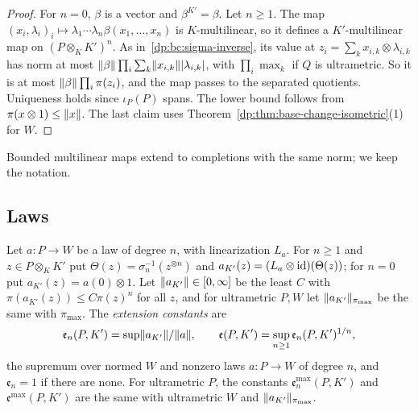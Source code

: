 \begin{proof}
For $n=0$, $\beta$ is a vector and $\beta^{K'}=\beta$. Let $n\ge1$. The map $(x_i,\lambda_i)_i\mapsto\lambda_1\cdots\lambda_n\beta(x_1,\dots,x_n)$ is $K$-multilinear, so it defines a $K'$-multilinear map on $(P\otimes_KK')^n$. As in~\eqref{dp:bc:sigma-inverse}, its value at $z_i=\sum_kx_{i,k}\otimes\lambda_{i,k}$ has norm at most $\lVert \beta\rVert\prod_i\sum_k\lVert x_{i,k}\rVert\lvert \lambda_{i,k}\rvert$, with $\prod_i\max_k$ if $Q$ is ultrametric. So it is at most $\lVert \beta\rVert\prod_i\pi(z_i)$, and the map passes to the separated quotients. Uniqueness holds since $\iota_P(P)$ spans. The lower bound follows from $\pi(x\otimes1)\le\lVert x\rVert$. The last claim uses Theorem~\ref{dp:thm:base-change-isometric}(1) for $W$.
\end{proof}

Bounded multilinear maps extend to completions with the same norm; we keep the notation.

\subsection{Laws}

Let $a\colon P\to W$ be a law of degree $n$, with linearization $L_a$. For $n\ge1$ and $z\in P\otimes_KK'$ put $\Theta(z)=\sigma_n^{-1}(z^{\otimes n})$ and $a_{K'}(z)=(L_a\otimes\mathrm{id})(\Theta(z))$; for $n=0$ put $a_{K'}(z)=a(0)\otimes1$. Let $\lVert a_{K'}\rVert\in[0,\infty]$ be the least $C$ with $\pi(a_{K'}(z))\le C\pi(z)^n$ for all $z$, and for ultrametric $P,W$ let $\lVert a_{K'}\rVert_{\pi_{\max}}$ be the same with $\pi_{\max}$. The \emph{extension constants} are
\[
 \mathfrak e_n(P,K')=\sup\lVert a_{K'}\rVert/\lVert a\rVert,\qquad\mathfrak e(P,K')=\sup_{n\ge1}\mathfrak e_n(P,K')^{1/n},
\]
the supremum over normed $W$ and nonzero laws $a\colon P\to W$ of degree $n$, and $\mathfrak e_n=1$ if there are none. For ultrametric $P$, the constants $\mathfrak e^{\max}_n(P,K')$ and $\mathfrak e^{\max}(P,K')$ are the same with ultrametric $W$ and $\lVert a_{K'}\rVert_{\pi_{\max}}$.

